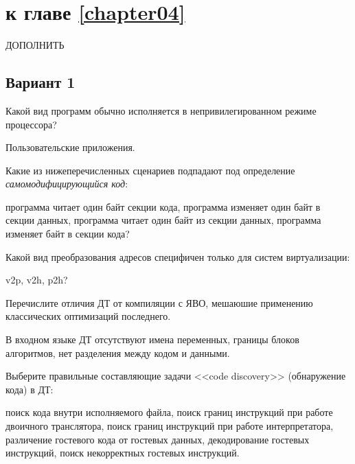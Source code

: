 \section{\Questions к главе \ref{chapter04}} %

\todo ДОПОЛНИТЬ

\subsection*{Вариант 1}

\begin{questions}


\question[3] Какой вид программ обычно исполняется в непривилегированном режиме процессора?
\begin{solution}[1cm]
Пользовательские приложения.
\end{solution}

\question[3] Какие из нижеперечисленных сценариев подпадают под определение \emph{самомодифицирующийся код}:
\begin{choices}
    \choice программа читает один байт  секции кода,
    \choice программа изменяет один байт в секции данных,
    \choice программа читает один байт из секции данных,
    \correctchoice программа изменяет байт в секции кода?
\end{choices}

\question[3] Какой вид преобразования адресов специфичен только для систем виртуализации:
\begin{choices}
    \choice v2p,
    \correctchoice v2h,
    \choice p2h?
\end{choices}


\question[3] Перечислите отличия ДТ от компиляции с ЯВО, мешаюшие применению классических оптимизаций последнего.
\begin{solution}[4cm]
В входном языке ДТ отсутствуют имена переменных, границы блоков алгоритмов, нет разделения между кодом и данными.
\end{solution}

\question[3] Выберите правильные составляющие задачи <<code discovery>> (обнаружение кода) в ДТ:
\begin{choices}
    \choice поиск кода внутри исполняемого файла,
    \correctchoice поиск границ инструкций при работе двоичного транслятора,
    \choice     поиск границ инструкций при работе интерпретатора,
    \correctchoice различение гостевого кода от гостевых данных,
    \choice     декодирование гостевых инструкций,
    \choice поиск некорректных гостевых инструкций.
\end{choices}


\end{questions}

